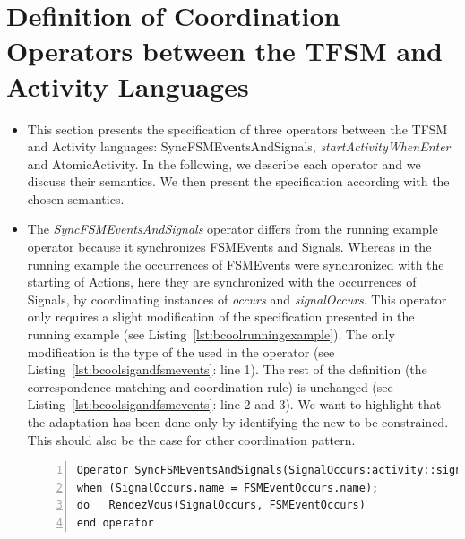 \section{Definition of Coordination Operators between the TFSM and Activity Languages}

\begin{itemize}
	\item This section presents the \bcool specification of three operators between the TFSM and Activity languages: {SyncFSMEventsAndSignals}, \emph{startActivityWhenEnter} and {AtomicActivity}. In the following, we describe each operator and we discuss their semantics. We then present the \bcool specification according with the chosen semantics.  
	
	\item The \emph{SyncFSMEventsAndSignals} operator differs from the running example operator because it synchronizes FSMEvents and Signals. Whereas in the running example the occurrences of FSMEvents were synchronized with the starting of Actions, here they are synchronized with the occurrences of Signals, \ie by coordinating instances of \dse \emph{occurs} and \emph{signalOccurs}. This operator only requires a slight modification of the specification presented in the running example (see Listing~\ref{lst:bcoolrunningexample}). The only modification is the type of the \dse used in the operator (see Listing~\ref{lst:bcoolsigandfsmevents}: line 1). The rest of the definition (\ie the correspondence matching and coordination rule) is unchanged (see Listing~\ref{lst:bcoolsigandfsmevents}: line 2 and 3). We want to highlight that the adaptation has been done only by identifying the new \dse to be constrained. This should also be the case for other coordination pattern.
	

	 
\begin{lstlisting}[language=bcool,
caption={\bcool specification of the \emph{SyncFSMEventsAndSignals} operator},
label={lst:bcoolsigandfsmevents}, 
basicstyle=\scriptsize\ttfamily, backgroundcolor=\color{LGrey}, numbers=left, xleftmargin=2pt]
Operator SyncFSMEventsAndSignals(SignalOccurs:activity::signalOccurs, FSMEventOccurs:tfsm::occurs)
when (SignalOccurs.name = FSMEventOccurs.name);
do   RendezVous(SignalOccurs, FSMEventOccurs)
end operator
\end{lstlisting}
	 
	 
	 

\end{itemize}
